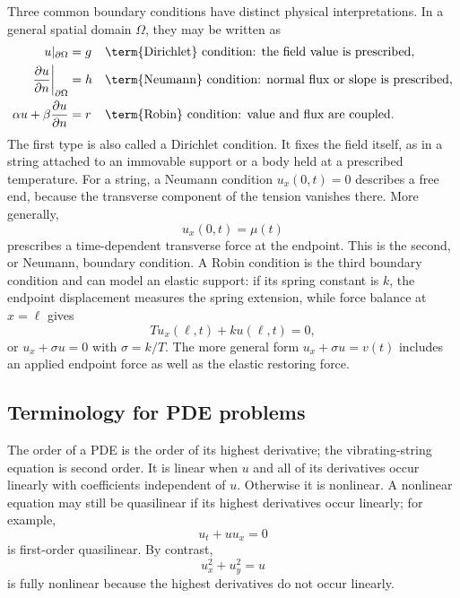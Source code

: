 Three common boundary conditions have distinct physical interpretations. In a general spatial domain $\Omega$, they may be written as
\begin{align}
u|_{\partial\Omega}&=g &&\text{\term{Dirichlet} condition: the field value is prescribed},\\
\frac{\partial u}{\partial n}\bigg|_{\partial\Omega}&=h &&\text{\term{Neumann} condition: normal flux or slope is prescribed},\\
\alpha u+\beta\frac{\partial u}{\partial n}&=r &&\text{\term{Robin} condition: value and flux are coupled}.
\end{align}
The first type is also called a Dirichlet condition. It fixes the field itself, as in a string attached to an immovable support or a body held at a prescribed temperature. For a string, a Neumann condition $u_x(0,t)=0$ describes a free end, because the transverse component of the tension vanishes there. More generally,
\begin{equation}
u_x(0,t)=\mu(t)
\end{equation}
prescribes a time-dependent transverse force at the endpoint. This is the second, or Neumann, boundary condition. A Robin condition is the third boundary condition and can model an elastic support: if its spring constant is $k$, the endpoint displacement measures the spring extension, while force balance at $x=\ell$ gives
\begin{equation}
T u_x(\ell,t)+k u(\ell,t)=0,
\end{equation}
or $u_x+\sigma u=0$ with $\sigma=k/T$. The more general form $u_x+\sigma u=v(t)$ includes an applied endpoint force as well as the elastic restoring force.

\subsection{Terminology for PDE problems}

The order of a PDE is the order of its highest derivative; the vibrating-string equation is second order. It is linear when $u$ and all of its derivatives occur linearly with coefficients independent of $u$. Otherwise it is nonlinear. A nonlinear equation may still be quasilinear if its highest derivatives occur linearly; for example,
\begin{equation}
u_t+u u_x=0
\end{equation}
is first-order quasilinear. By contrast,
\begin{equation}
u_x^2+u_y^2=u
\end{equation}
is fully nonlinear because the highest derivatives do not occur linearly.

